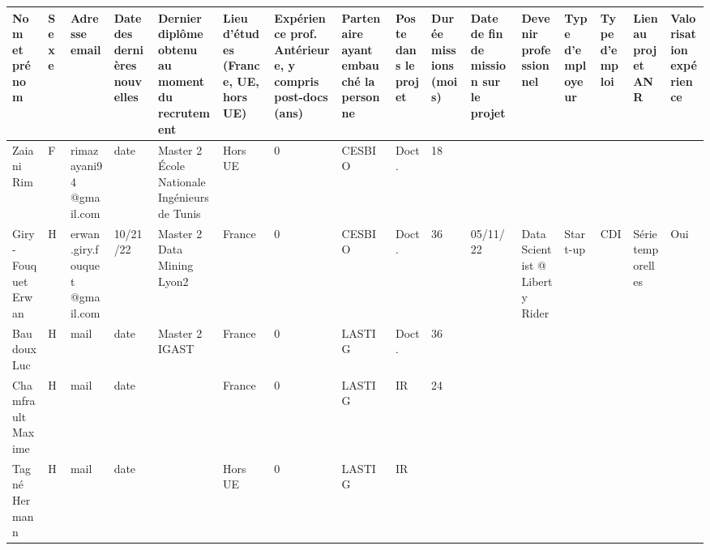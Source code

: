 \begin{sidewaystable}[htbp]
\tiny
    \centering
    \begin{tabular}{|m{1.85cm}|m{0.35cm}|m{1.25cm}|m{1.15cm}|m{1.25cm}|m{1.25cm}|m{1.25cm}|m{}|m{}|m{}|m{}|m{}|m{}|m{}|m{1cm}|m{1cm}|}
    \hline
Nom et prénom & Sexe& Adresse email & Date des dernières nouvelles
 & Dernier diplôme obtenu au moment du recrutement  & 
Lieu d'études (France, UE, hors UE)  & 
Expérience prof. Antérieure, y compris post-docs (ans)  & 
Partenaire ayant embauché la personne  & 
Poste dans le projet  & 
Durée  missions (mois)  & 
Date de fin de mission sur le projet & 
Devenir professionnel & 
Type d’employeur & 
Type d’emploi  & 
Lien au projet ANR & 
Valorisation expérience \\\hline

Zaiani Rim&F&rimazayani94 @gmail.com&date&Master 2 École Nationale Ingénieurs de Tunis&Hors UE&0&CESBIO&Doct.&18&&&&&&\\\hline
Giry-Fouquet Erwan&H& erwan.giry.fouquet @gmail.com&10/21/22&Master 2 Data Mining Lyon2&France&0&CESBIO&Doct.&36& 05/11/22&  Data Scientist @ Liberty Rider &Start-up&CDI&Série temporelles&Oui\\\hline
Baudoux Luc&H&mail&date&Master 2 IGAST&France&0&LASTIG&Doct.&36&&&&&&\\\hline
Chamfrault Maxime&H&mail&date&&France&0&LASTIG&IR&24&&&&&&\\\hline
Tagné Hermann&H&mail&date&&Hors UE&0&LASTIG&IR&&&&&&&\\

      \hline
    \end{tabular}
    \label{tab:people}
\end{sidewaystable}


